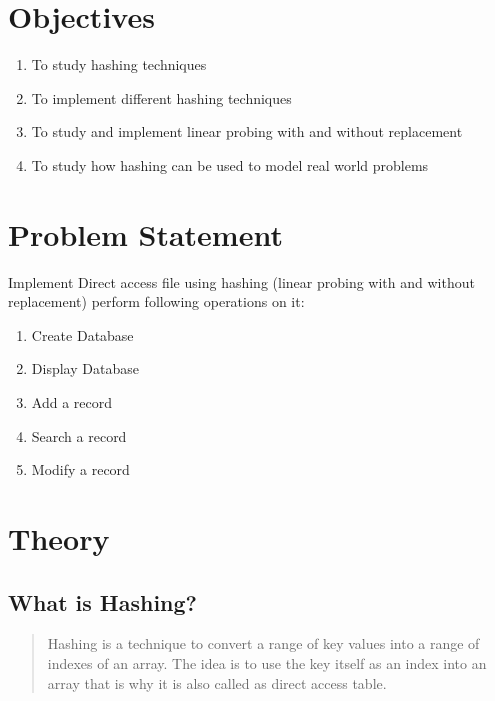 \documentclass[11pt]{article}
\begin{document}
\tableofcontents
\thispagestyle{empty}
\clearpage

\setcounter{page}{1}

\section{Objectives}
\begin{enumerate}
    \item To study hashing techniques
    \item To implement different hashing techniques
    \item To study and implement linear probing with and without replacement
    \item To study how hashing can be used to model real world problems
\end{enumerate}

\section{Problem Statement}
Implement Direct access file using hashing (linear probing with and without
replacement) perform following operations on it:
\begin{enumerate}
    \item Create Database
    \item Display Database
    \item Add a record
    \item Search a record
    \item Modify a record
\end{enumerate}

\section{Theory}

\subsection{What is Hashing?}
\begin{quote}
    Hashing is a technique to convert a range of key values into a range of
    indexes of an array. The idea is to use the key itself as an index into an
    array that is why it is also called as direct access table.
\end{quote}
\end{document}
